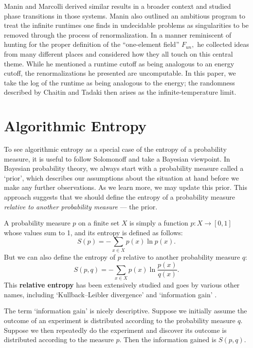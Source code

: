 \documentclass{article}
\renewcommand{\to}{\rightarrow}
\newcommand{\maps}{\colon}
\begin{document}
Manin and Marcolli \cite{MM2009} derived similar results in a broader context
and studied phase transitions in those systems.  Manin \cite{ManinRenorm1, ManinRenorm2} 
also outlined an ambitious program to
treat the infinite runtimes one finds in undecidable problems as singularities
to be removed through the process of renormalization.  In a
manner reminiscent of hunting for the proper definition of the 
``one-element field'' $F_{un},$ he collected ideas from
many different places and considered how they all touch on this central theme.
While he mentioned a runtime cutoff as being analogous to an energy cutoff,
the renormalizations he presented are uncomputable.  In this paper, we
take the log of the runtime as being analogous to the energy; the randomness
described by Chaitin and Tadaki then arises as the infinite-temperature
limit.

\section{Algorithmic Entropy}\label{entropy}

To see algorithmic entropy as a special case of the entropy of a
probability measure, it is useful to follow Solomonoff
\cite{Solomonoff1964} and take a Bayesian viewpoint.  In 
Bayesian probability theory, we always start with a probability
measure called a `prior', which describes our assumptions 
about the situation at hand before we make any further observations.
As we learn more, we may update this prior.  This approach suggests
that we should define the entropy of a probability measure
\textit{relative to another probability measure} --- the prior.

A probability measure $p$ on a finite set $X$ is simply a function $p
\maps X \to [0,1]$ whose values sum to 1, and its entropy is defined
as follows:
\[  S(p) = -\sum_{x \in X} p(x) \ln p(x)  .\]
But we can also define the entropy of $p$ relative to another 
probability measure $q$:
\[  S(p,q) = -\sum_{x \in X} p(x) \ln\frac{p(x)}{q(x)} .\]
This {\bf relative entropy} has been extensively studied and goes by
various other names, including `Kullback--Leibler divergence' \cite{KL}
and `information gain' \cite{Renyi}.  

The term `information gain' is nicely descriptive.  Suppose we 
initially assume the outcome of an experiment is distributed according to 
the probability measure $q$.  Suppose we then repeatedly do the experiment
and discover its outcome is distributed according to the measure $p$.
Then the information gained is $S(p,q)$.
\end{document}
